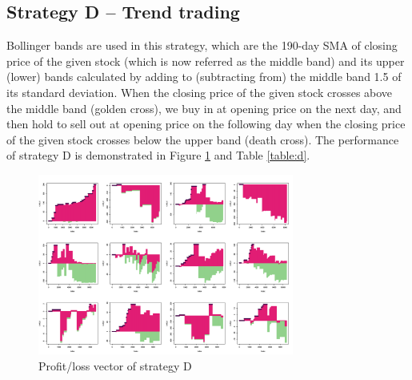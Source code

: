\documentclass[12pt, letterpaper, oneside]{article}
\begin{document}
\subsection{Strategy D -- Trend trading}
Bollinger bands are used in this strategy, which are the 190-day SMA of closing price of the given stock (which is now referred as the middle band) and its upper (lower) bands calculated by adding to (subtracting from) the middle band 1.5 of its standard deviation. When the closing price of the given stock crosses above the middle band (golden cross), we buy in at opening price on the next day, and then hold to sell out at opening price on the following day when the closing price of the given stock crosses below the upper band (death cross). The performance of strategy D is demonstrated in Figure \ref{fig:d} and Table \ref{table:d}.

\begin{figure}[h]
    \centering
    \includegraphics[width=0.75\textwidth]{sd_pl}
    \caption{Profit/loss vector of strategy D}
    \label{fig:d}
\end{figure}
\end{document}
